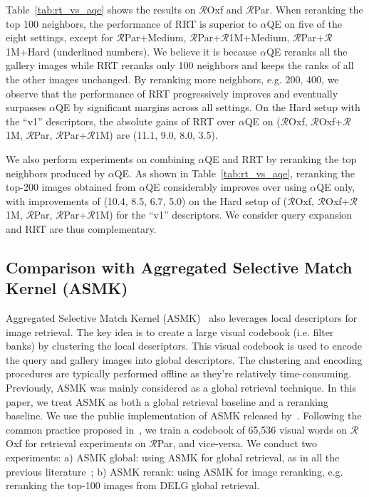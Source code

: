 Table~\ref{tab:rt_vs_aqe} shows the results on $\mathcal{R}$Oxf and $\mathcal{R}$Par.
When reranking the top 100 neighbors, the performance of RRT is superior to $\alpha$QE on five of the eight settings, except for $\mathcal{R}$Par+Medium, $\mathcal{R}$Par+$\mathcal{R}$1M+Medium, $\mathcal{R}$Par+$\mathcal{R}$1M+Hard (underlined numbers).
We believe it is because $\alpha$QE reranks all the gallery images while RRT reranks only 100 neighbors and keeps the ranks of all the other images unchanged.
By reranking more neighbors, e.g. 200, 400, we observe that the performance of RRT progressively improves and eventually surpasses $\alpha$QE by significant margins across all settings.
On the Hard setup with the ``v1'' descriptors, the absolute gains of RRT over $\alpha$QE on ($\mathcal{R}$Oxf, $\mathcal{R}$Oxf+$\mathcal{R}$1M, $\mathcal{R}$Par, $\mathcal{R}$Par+$\mathcal{R}$1M) are (11.1, 9.0, 8.0, 3.5).

We also perform experiments on combining $\alpha$QE and RRT by reranking the top neighbors produced by $\alpha$QE.
As shown in Table~\ref{tab:rt_vs_aqe}, reranking the top-200 images obtained from $\alpha$QE considerably improves over using $\alpha$QE only, with improvements of (10.4, 8.5, 6.7, 5.0) on the Hard setup of ($\mathcal{R}$Oxf, $\mathcal{R}$Oxf+$\mathcal{R}$1M, $\mathcal{R}$Par, $\mathcal{R}$Par+$\mathcal{R}$1M) for the ``v1'' descriptors.
We consider query expansion and RRT are thus complementary.



\subsection{Comparison with Aggregated Selective Match Kernel (ASMK)}

Aggregated Selective Match Kernel (ASMK)~\cite{asmk2016} also leverages local descriptors for image retrieval. 
The key idea is to create a large visual codebook (i.e. filter banks) by clustering the local descriptors.
This visual codebook is used to encode the query and gallery images into global descriptors. 
The clustering and encoding procedures are typically performed offline as they're relatively time-consuming.
Previously, ASMK was mainly considered as a global retrieval technique. 
In this paper, we treat ASMK as both a global retrieval baseline and a reranking baseline.
We use the public implementation of ASMK released by~\cite{rasmk2019}.
Following the common practice proposed in~\cite{rasmk2019}, we train a codebook of 65,536 visual words on $\mathcal{R}$Oxf for retrieval experiments on $\mathcal{R}$Par, and vice-versa. 
We conduct two experiments: a) ASMK global: using ASMK for global retrieval, as in all the previous literature~\cite{asmk2016, rasmk2019, how2020}; b) ASMK rerank: using ASMK for image reranking, e.g. reranking the top-100 images from DELG global retrieval. 

